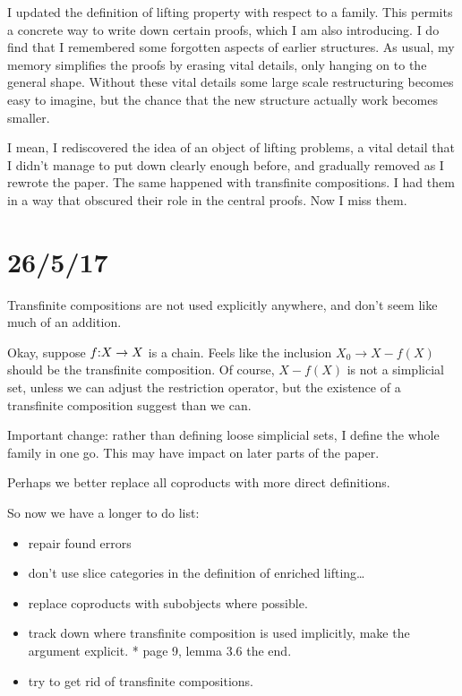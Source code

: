 \documentclass[csh.tex]{subfiles}
\begin{document}
I updated the definition of lifting property with respect to a family. This permits a concrete way to write down certain proofs, which I am also introducing.
I do find that I remembered some forgotten aspects of earlier structures. As usual, my memory simplifies the proofs by erasing vital details, only hanging on to the general shape. Without these vital details some large scale restructuring becomes easy to imagine, but the chance that the new structure actually work becomes smaller.

I mean, I rediscovered the idea of an object of lifting problems, a vital detail that I didn't manage to put down clearly enough before, and gradually removed as I rewrote the paper. The same happened with transfinite compositions. I had them in a way that obscured their role in the central proofs. Now I miss them.

\section{26/5/17}

Transfinite compositions are not used explicitly anywhere, and don't seem like much of an addition.

Okay, suppose $f\mathord : X\to X$ is a chain. Feels like the inclusion $X_0 \to X - f(X)$ should be the transfinite composition. Of course, $X - f(X)$ is not a simplicial set, unless we can adjust the restriction operator, but the existence of a transfinite composition suggest than we can.

Important change: rather than defining loose simplicial sets, I define the whole family in one go.
This may have impact on later parts of the paper.

Perhaps we better replace all coproducts with more direct definitions.

So now we have a longer to do list:
\begin{itemize}
\item repair found errors
\item don't use slice categories in the definition of enriched lifting\dots
\item replace coproducts with subobjects where possible.
\item track down where transfinite composition is used implicitly, make the argument explicit.
  * page 9, lemma 3.6 the end.
	
\item try to get rid of transfinite compositions.
\end{itemize}
\end{document}
